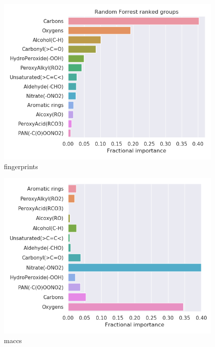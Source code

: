 \begin{subfigure}[b]{0.4\textwidth}
    \centering
    \includegraphics[width=\textwidth]{outputs/PCA/fingerprints/legend.png}
    \caption{fingerprints}
    \label{fig:legend_PCA_fingerprints}
\end{subfigure}
\begin{subfigure}[b]{0.4\textwidth}
    \centering
    \includegraphics[width=\textwidth]{outputs/PCA/maccs/legend.png}
    \caption{maccs}
    \label{fig:legend_PCA_maccs}
\end{subfigure}
